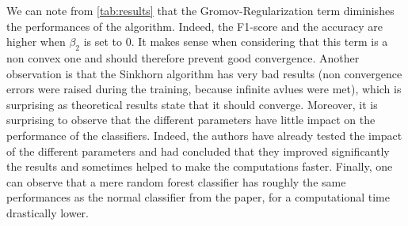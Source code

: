 \documentclass[a4paper,11pt]{article}
\begin{document}
We can note from \ref{tab:results} that the Gromov-Regularization term diminishes the performances of the algorithm. 
Indeed, the F1-score and the accuracy are higher when $\beta_2$ is set to 0.
It makes sense when considering that this term is a non convex one and should therefore prevent good convergence. 
Another observation is that the Sinkhorn algorithm has very bad results (non convergence errors were raised during the training, because infinite avlues were met), which is surprising as theoretical results state that it should converge. 
Moreover, it is surprising to observe that the different parameters have little impact on the performance of the classifiers. 
Indeed, the authors have already tested the impact of the different parameters and had concluded that they improved significantly the results and sometimes helped to make the computations faster. 
Finally, one can observe that a mere random forest classifier has roughly the same performances as the normal classifier from the paper, for a computational time drastically lower. 
\end{document}
